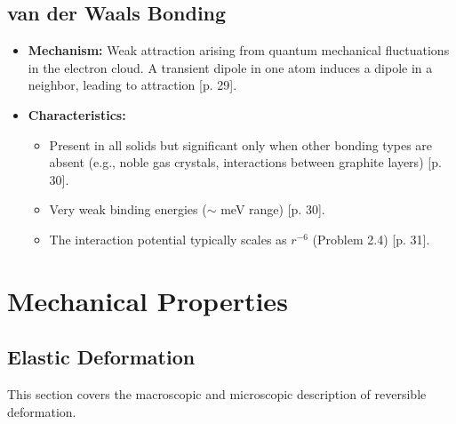 \documentclass[a4paper,oneside,article]{memoir}
\begin{document}
\setcounter{section}{5}
\section{van der Waals Bonding}
\begin{itemize}
    \item \textbf{Mechanism:} Weak attraction arising from quantum mechanical fluctuations in the electron cloud. A transient dipole in one atom induces a dipole in a neighbor, leading to attraction [p. 29].
    \item \textbf{Characteristics:}
    \begin{itemize}
        \item Present in all solids but significant only when other bonding types are absent (e.g., noble gas crystals, interactions between graphite layers) [p. 30].
        \item Very weak binding energies ($\sim$ meV range) [p. 30].
        \item The interaction potential typically scales as $r^{-6}$ (Problem 2.4) [p. 31].
    \end{itemize}
\end{itemize}

\chapter{Mechanical Properties}

\section{Elastic Deformation}
This section covers the macroscopic and microscopic description of reversible deformation.
\end{document}
